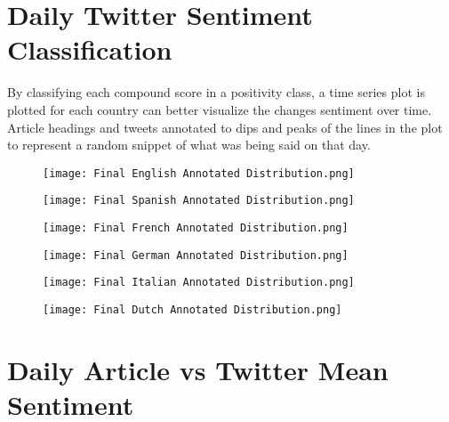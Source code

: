 \section{Daily Twitter Sentiment Classification}

By classifying each compound score in a positivity class, a time series plot is plotted for each country can better visualize the changes sentiment over time.
Article headings and tweets annotated to dips and peaks of the lines in the plot to represent a random snippet of what was being said on that day.

\begin{figure}[h!]
\texttt{[image: Final English Annotated Distribution.png]}
\caption[English Annotated Sentiment Distribution]{ }
\label{fig:English}
\end{figure}

\begin{figure}[h!]
\texttt{[image: Final Spanish Annotated Distribution.png]}
\caption[English Annotated Sentiment Distribution]{ }
\label{fig:Spanish}
\end{figure}

\begin{figure}[h!]
\texttt{[image: Final French Annotated Distribution.png]}
\caption[Final French Annotated Distribution]{ }
\label{fig:French}
\end{figure}

\begin{figure}[h!]
\texttt{[image: Final German Annotated Distribution.png]}
\caption[Final German Annotated Distribution]{ }
\label{fig:German}
\end{figure}

\begin{figure}[h!]
\texttt{[image: Final Italian Annotated Distribution.png]}
\caption[Final Italian Annotated Distribution]{ }
\label{fig:Italian}
\end{figure}

\begin{figure}[h!]
\texttt{[image: Final Dutch Annotated Distribution.png]}
\caption[Final Dutch Annotated Distribution]{ }
\label{fig:Dutch}
\end{figure}


\section{Daily Article vs Twitter Mean Sentiment}

